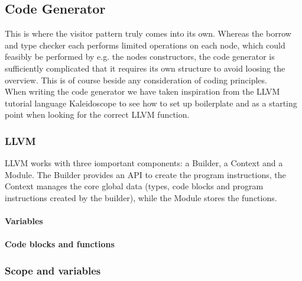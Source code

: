 \subsection{Code Generator}
\label{sec:CodeGenImplement}
This is where the visitor pattern truly comes into its own. Whereas the borrow and type checker each performs limited operations on each node, which could feasibly be performed by e.g. the nodes constructors, the code generator is sufficiently complicated that it requires its own structure to avoid loosing the overview. This is of course beside any consideration of coding principles.\\
When writing the code generator we have taken inspiration from the LLVM tutorial language Kaleidoscope \cite{LLVMTutorial} to see how to set up boilerplate and as a starting point when looking for the correct LLVM function.

\subsubsection{LLVM}
LLVM works with three iomportant components: a Builder, a Context and a Module. The Builder provides an API to create the program instructions, the Context manages the core global data (types, code blocks and program instructions created by the builder), while the Module stores the functions.

\paragraph*{Variables}


\paragraph*{Code blocks and functions}


\subsubsection{Scope and variables}


